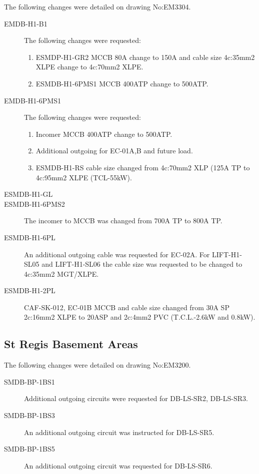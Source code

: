 The following changes were detailed on drawing No:EM3304.

\begin{description}
\item[EMDB-H1-B1]  The following changes were requested:
   \begin{enumerate}
      \item ESMDP-H1-GR2 MCCB 80A change to 150A and cable size 4c:35mm2 XLPE change to 4c:70mm2 XLPE.
      \item ESMDB-H1-6PMS1 MCCB 400ATP change to 500ATP.
   \end{enumerate}
\item[EMDB-H1-6PMS1] The following changes were requested:
    \begin{enumerate}
       \item Incomer MCCB 400ATP change to 500ATP.
       \item Additional outgoing for EC-01A,B and future load.
       \item ESMDB-H1-RS cable size changed from 4c:70mm2 XLP (125A TP to 4c:95mm2 XLPE (TCL-55kW).
    \end{enumerate}
\item[ESMDB-H1-GL]
\item[ESMDB-H1-6PMS2]  The incomer to MCCB was changed from 700A TP to 800A TP.
\item[ESMDB-H1-6PL] An additional outgoing cable was requested for EC-02A. For LIFT-H1-SL05 and LIFT-H1-SL06 the cable size was requested to be changed to 4c:35mm2 MGT/XLPE.
\item[ESMDB-H1-2PL] CAF-SK-012, EC-01B MCCB and cable size changed from 30A SP 2c:16mm2 XLPE to 20ASP and 2c:4mm2 PVC (T.C.L.-2.6kW and 0.8kW).
\end{description}

\subsection{St Regis Basement Areas}
The following changes were detailed on drawing No:EM3200.
\begin{description}
\item[SMDB-BP-1BS1] Additional outgoing circuits were requested for DB-LS-SR2, DB-LS-SR3.
\item[SMDB-BP-1BS3]  An additional outgoing circuit was instructed for DB-LS-SR5.
\item[SMDB-BP-1BS5] An additional outgoing circuit was requested for DB-LS-SR6.
\end{description}

